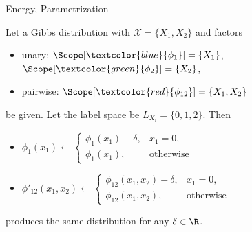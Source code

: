 \begin{frame}{Energy, Parametrization}
\begin{example}
\begin{minipage}{0.4\textwidth}
\begin{center}
\end{center}
\end{minipage}
\begin{minipage}{0.59\textwidth}
    Let a Gibbs distribution with $\mathcal{X} = \{X_1,X_2\}$ and factors 
    \begin{itemize}
    \item unary: $\Scope[\textcolor{blue}{\phi_1}] = \{X_1\}$, $\Scope[\textcolor{green}{\phi_2}] = \{X_2\}$,
    \item pairwise: $\Scope[\textcolor{red}{\phi_{12}}] = \{X_1, X_2\}$ 
    \end{itemize}
    be given.
    Let the label space be $L_{X_i} = \{0,1,2\}$.
    Then 
    \begin{itemize}
    \item $\phi_1(x_1) \leftarrow \begin{cases} \phi_1(x_1) + \delta, & x_1 = 0, \\ \phi_{1}(x_1), & \text{otherwise}\end{cases}$
    \item $\phi'_{12}(x_1,x_2) \leftarrow \begin{cases} \phi_{12}(x_1,x_2) - \delta, & x_1 = 0, \\ \phi_{12}(x_1,x_2), & \text{otherwise}\end{cases}$
    \end{itemize}
    produces the same distribution for any $\delta \in \R$.
\end{minipage}
\end{example}
\end{frame}

